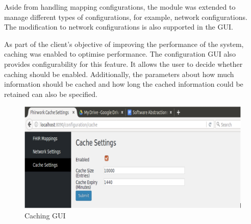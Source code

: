 \documentclass[sigconf]{acmart}
\begin{document}
Aside from handling mapping configurations, the module was extended to manage different types of configurations, for example, network configurations. The modification to network configurations is also supported in the GUI. 

As part of the client’s objective of improving the performance of the system, caching was enabled to optimise performance. The configuration GUI also provides configurability for this feature. It allows the user to decide whether caching should be enabled. Additionally, the parameters about how much information should be cached and how long the cached information could be retained can also be specified.

\begin{figure}[!!h] 
	\centering 
	\includegraphics[width=0.8\columnwidth]{caching.png}
	\caption{Caching GUI} 
	\label{fig:cache}
\end{figure}
\end{document}
